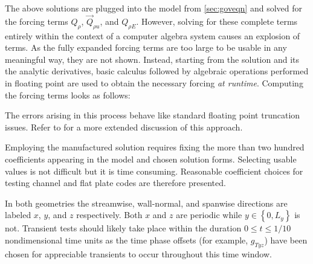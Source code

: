 

The above solutions are plugged into the model from
\autoref{sec:goveqn} and solved for the forcing terms $Q_{\rho}$,
$\vec{Q}_{\rho{}u}$, and $Q_{\rho{}E}$.  However, solving for these complete
terms entirely within the context of a computer algebra system causes an
explosion of terms.  As the fully expanded forcing terms are too large
to be usable in any meaningful way, they are not shown.
%
Instead, starting from the solution and its the analytic derivatives, basic
calculus followed by algebraic operations performed in floating point are used
to obtain the necessary forcing \emph{at runtime}.
%
Computing the forcing terms looks as follows:

%
The errors arising in this
process behave like standard floating point truncation issues.  Refer to
\citet{Ulerich2012MMS} for a more extended discussion of this approach.




Employing the manufactured solution requires fixing the more than two hundred
coefficients appearing in the model and chosen solution forms.  Selecting usable
values is not difficult but it is time consuming.
Reasonable coefficient choices for testing channel and flat plate codes
are therefore presented.

In both geometries the streamwise, wall-normal, and spanwise directions are
labeled $x$, $y$, and $z$ respectively.  Both $x$ and $z$ are periodic while
$y\in\left\{0,L_y\right\}$ is not.  Transient tests should likely take place
within the duration $0\leq{}t\leq{}1/10$ nondimensional time units as the time
phase offsets (for example, $g_{Tyz}$) have been chosen for appreciable transients to
occur throughout this time window.

